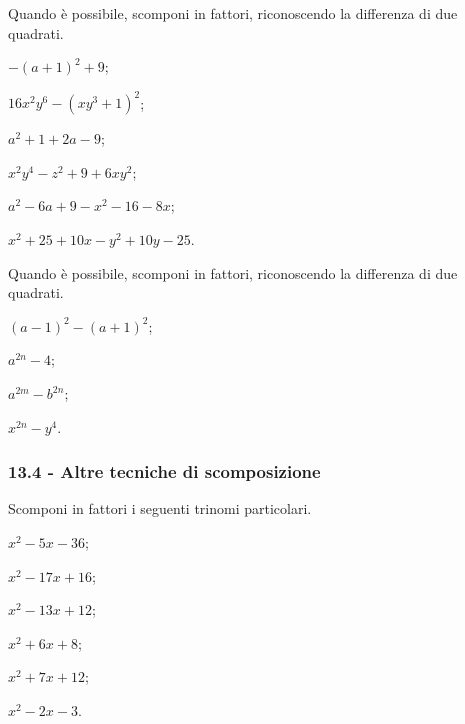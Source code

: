 \begin{esercizio}[\Ast]
\label{ese:13.55}
Quando è possibile, scomponi in fattori, riconoscendo la differenza di due quadrati.
\begin{multicols}{2}
\begin{enumeratea}
 \item $-(a+1)^{2}+9$;
 \item $16x^{2}y^{6}-(xy^{3}+1)^{2}$;
 \item $a^{2}+1+2a-9$;
 \item $x^{2}y^{4}-z^{2}+9+6xy^{2}$;
 \item $a^{2}-6a+9-x^{2}-16-8x$;
 \item $x^{2}+25+10x-y^{2}+10y-25$.
\end{enumeratea}
\end{multicols}
\end{esercizio}
\pagebreak
\begin{esercizio}[\Ast]
\label{ese:13.56}
Quando è possibile, scomponi in fattori, riconoscendo la differenza di due quadrati.
\begin{multicols}{2}
\begin{enumeratea}
 \item $(a-1)^{2}-(a+1)^{2}$;
 \item $a^{2n}-4$;
 \item $a^{2m}-b^{2n}$;
 \item $x^{2n}-y^{4}$.
\end{enumeratea}
\end{multicols}
\end{esercizio}

\subsubsection*{13.4 - Altre tecniche di scomposizione}

\begin{esercizio}
 \label{ese:13.57}
 Scomponi in fattori i seguenti trinomi particolari.
 \begin{multicols}{3}
 \begin{enumeratea}
 \item $x^{2}-5x-36$;
 \item $x^{2}-17x+16$;
 \item $x^{2}-13x+12$;
 \item $x^{2}+6x+8$;
 \item $x^{2}+7x+12$;
 \item $x^{2}-2x-3$.
 \end{enumeratea}
\end{multicols}
\end{esercizio}

